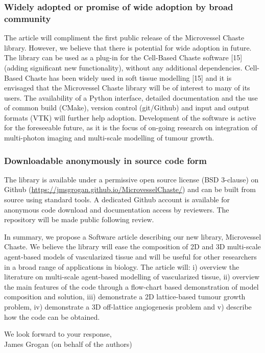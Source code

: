 \documentclass[fullpage,11pt]{article}
\begin{document}
\subsubsection*{Widely adopted or promise of wide adoption by broad community}
The article will compliment the first public release of the Microvessel Chaste library. However, we believe that there is potential for wide adoption in future. The library can be used as a plug-in for the Cell-Based Chaste software [15] (adding significant new functionality), without any additional dependencies. Cell-Based Chaste has been widely used in soft tissue modelling [15] and it is envisaged that the Microvessel Chaste library will be of interest to many of its users. The availability of a Python interface, detailed documentation and the use of common build (CMake), version control (git/Github) and input and output formats (VTK) will further help adoption. Development of the software is active for the foreseeable future, as it is the focus of on-going research on integration of multi-photon imaging and multi-scale modelling of tumour growth.

\subsubsection*{Downloadable anonymously in source code form}
The library is available under a permissive open source license (BSD 3-clause) on Github (\url{https://jmsgrogan.github.io/MicrovesselChaste/}) and can be built from source using standard tools. A dedicated Github account is available for anonymous code download and documentation access by reviewers. The repository will be made public following review.

In summary, we propose a Software article describing our new library, Microvessel Chaste. We believe the library will ease the composition of 2D and 3D multi-scale agent-based models of vascularized tissue and will be useful for other researchers in a broad range of applications in biology. The article will: i) overview the literature on multi-scale agent-based modelling of vascularized tissue, ii) overview the main features of the code through a flow-chart based demonstration of model composition and solution, iii) demonstrate a 2D lattice-based tumour growth problem, iv) demonstrate a 3D off-lattice angiogenesis problem and v) describe how the code can be obtained.

\noindent We look forward to your response, \\ James Grogan (on behalf of the authors)\\
\end{document}
